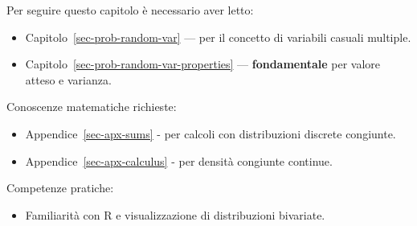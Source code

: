\documentclass[
  italian,
  letterpaper,
  a4paper,
  11pt,
  open=any]{scrbook}
\providecommand{\tightlist}{%
  \setlength{\itemsep}{0pt}\setlength{\parskip}{0pt}}
\theoremstyle{plain}
\theoremstyle{definition}
\theoremstyle{definition}
\theoremstyle{remark}
\begin{document}
\begin{tcolorbox}[enhanced jigsaw, arc=.35mm, bottomrule=.15mm, bottomtitle=1mm, breakable, colback=white, colbacktitle=quarto-callout-tip-color!10!white, colframe=quarto-callout-tip-color-frame, coltitle=black, left=2mm, leftrule=.75mm, opacityback=0, opacitybacktitle=0.6, rightrule=.15mm, title=\textcolor{quarto-callout-tip-color}{\faLightbulb}\hspace{0.5em}{Prerequisiti}, titlerule=0mm, toprule=.15mm, toptitle=1mm]

Per seguire questo capitolo è necessario aver letto:

\begin{itemize}
\tightlist
\item
  Capitolo~\ref{sec-prob-random-var} --- per il concetto di variabili
  casuali multiple.
\item
  Capitolo~\ref{sec-prob-random-var-properties} ---
  \textbf{fondamentale} per valore atteso e varianza.
\end{itemize}

Conoscenze matematiche richieste:

\begin{itemize}
\tightlist
\item
  Appendice~\ref{sec-apx-sums} - per calcoli con distribuzioni discrete
  congiunte.
\item
  Appendice~\ref{sec-apx-calculus} - per densità congiunte continue.
\end{itemize}

Competenze pratiche:

\begin{itemize}
\tightlist
\item
  Familiarità con R e visualizzazione di distribuzioni bivariate.
\end{itemize}

\end{tcolorbox}
\end{document}
